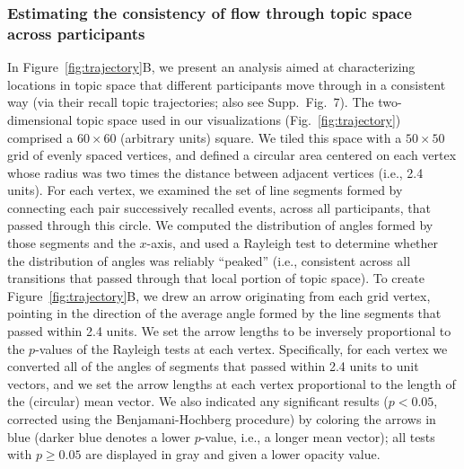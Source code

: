 \documentclass[10pt]{article}
\newcommand{\arrows}{7}
\begin{document}
\subsubsection*{Estimating the consistency of flow through topic space across participants}
In Figure~\ref{fig:trajectory}B, we present an analysis aimed at characterizing locations in topic space that different participants move through in a consistent way (via their recall topic trajectories; also see Supp.\ Fig.~\arrows).  The two-dimensional topic space used in our visualizations (Fig.~\ref{fig:trajectory}) comprised a $60 \times 60$ (arbitrary units) square.  We tiled this space with a $50 \times 50$ grid of evenly spaced vertices, and defined a circular area centered on each vertex whose radius was two times the distance between adjacent vertices (i.e., 2.4 units).  For each vertex, we examined the set of line segments formed by connecting each pair successively recalled events, across all participants, that passed through this circle.  We computed the distribution of angles formed by those segments and the $x$-axis, and used a Rayleigh test to determine whether the distribution of angles was reliably ``peaked'' (i.e., consistent across all transitions that passed through that local portion of topic space).  To create Figure~\ref{fig:trajectory}B, we drew an arrow originating from each grid vertex, pointing in the direction of the average angle formed by the line segments that passed within 2.4 units.  We set the arrow lengths to be inversely proportional to the $p$-values of the Rayleigh tests at each vertex.  Specifically, for each vertex we converted all of the angles of segments that passed within 2.4 units to unit vectors, and we set the arrow lengths at each vertex proportional to the length of the (circular) mean vector.  We also indicated any significant results ($p < 0.05$, corrected using the Benjamani-Hochberg procedure) by coloring the arrows in blue (darker blue denotes a lower $p$-value, i.e., a longer mean vector); all tests with $p \geq 0.05$ are displayed in gray and given a lower opacity value.
\end{document}
